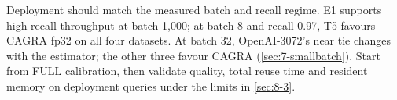 Deployment should match the measured batch and recall regime.
E1 supports high-recall throughput at batch 1,000; at batch 8 and recall
0.97, T5 favours CAGRA fp32 on all four datasets. At batch 32,
OpenAI-3072's near tie changes with the estimator; the other three
favour CAGRA (\cref{sec:7-smallbatch}). Start from FULL calibration,
then validate quality, total reuse time and resident memory on deployment
queries under the limits in \cref{sec:8-3}.
